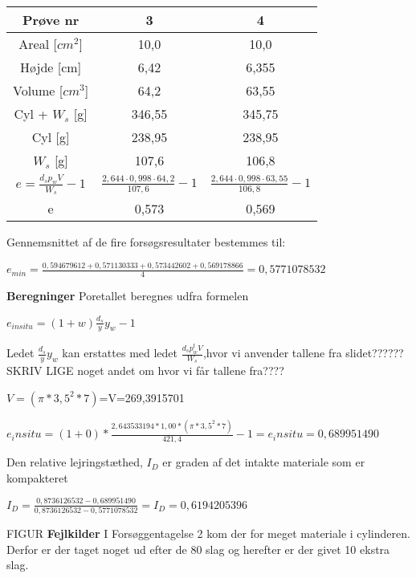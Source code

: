 \begin{center}
	\begin{tabular}{ |c|c|c| } 
		\hline
		Prøve nr & 3 & 4 \\	\hline
		Areal [$cm^2$] & 10,0 & 10,0 \\ \hline
		Højde [cm] & 6,42 & 6,355 \\ \hline
		Volume [$cm^3$] & 64,2 & 63,55 \\ \hline
		Cyl + $W_s$ [g] & 346,55 & 345,75 \\ \hline
		Cyl [g] & 238,95 & 238,95 \\ \hline
		$W_s$ [g] & 107,6 & 106,8 \\ \hline
		$e=\frac{d_sp_wV}{W_s}-1$ & $\frac{2,644\cdot0,998\cdot64,2}{107,6}-1$ & $\frac{2,644\cdot0,998\cdot63,55}{106,8}-1$  \\ \hline
		e & 0,573 & 0,569 \\ \hline
	\end{tabular}
\end{center}

Gennemsnittet af de fire forsøgsresultater bestemmes til:
\begin{center}
	$e_{min}=\frac{0,594679612+0,571130333+0,573442602+0,569178866}{4}=0,5771078532$
\end{center}

\textbf{Beregninger}
\newline
Poretallet beregnes udfra formelen
\begin{center}
	$e_{insitu}=(1 + w)\frac{d_s}{y}y_w-1$
\end{center}

Ledet $\frac{d_s}{y}y_w$ kan erstattes med ledet $\frac{d_sp_w^tV}{W_s}$,hvor vi anvender tallene fra slidet?????? SKRIV LIGE noget andet om hvor vi får tallene fra????
\begin{center}
	$V=(\pi*3,5^2*7)$=V=269,3915701
\end{center}
\begin{center}
	$e_insitu=(1+0)*\frac{2,643533194*1,00*(\pi*3,5^2*7)}{421,4}-1=e_insitu=0,689951490$
\end{center}

Den relative lejringstæthed, $I_D$ er graden af det intakte materiale som er kompakteret
\begin{center}
	$I_D=\frac{0,8736126532-0,689951490}{0,8736126532-0,5771078532}=I_D=0,6194205396$
\end{center}

FIGUR
\newline
\newline
\textbf{Fejlkilder}
I Forsøggentagelse 2 kom der for meget materiale i cylinderen. Derfor er der taget noget ud efter de 80 slag og herefter er der givet 10 ekstra slag. 